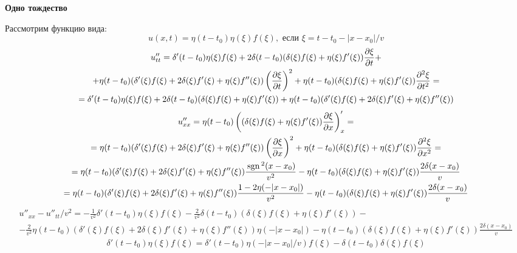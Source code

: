 \textbf{Одно тождество}

Рассмотрим функцию вида:
\[
	u(x, t) = \eta(t - t_0) \eta(\xi) f(\xi), \text{ если } \xi = t - t_0 - |x - x_0|/v 
\]
\[
	\begin{gathered}
	u''_{tt} = 
	\delta'(t - t_0) \eta(\xi) f(\xi) + 
	2 \delta(t - t_0) (\delta(\xi) f(\xi) + \eta(\xi) f'(\xi)) \frac{\partial \xi}{\partial t} + 
	\\ +
	\eta(t - t_0) (\delta'(\xi) f(\xi) + 2 \delta(\xi) f'(\xi) + \eta(\xi) f''(\xi)) \left(\frac{\partial \xi}{\partial t}\right)^2 +
	\eta(t - t_0) (\delta(\xi) f(\xi) + \eta(\xi) f'(\xi)) \frac{\partial^2 \xi}{\partial t^2} =
	\\ =
	\delta'(t - t_0) \eta(\xi) f(\xi) + 
	2 \delta(t - t_0) (\delta(\xi) f(\xi) + \eta(\xi) f'(\xi)) +
	\eta(t - t_0) (\delta'(\xi) f(\xi) + 2 \delta(\xi) f'(\xi) + \eta(\xi) f''(\xi))
	\end{gathered}
\]
\[
	\begin{gathered}
	u''_{xx} = 
	\eta(t - t_0) 
	\left(
	(\delta(\xi) f(\xi) + \eta(\xi) f'(\xi)) \frac{\partial \xi}{\partial x} 
	\right)'_x = 
	\\ =
	\eta(t - t_0)
	(\delta'(\xi) f(\xi) + 2 \delta(\xi) f'(\xi) + \eta(\xi) f''(\xi)) \left(\frac{\partial \xi}{\partial x}\right)^2 
	+
	\eta(t - t_0)
	(\delta(\xi) f(\xi) + \eta(\xi) f'(\xi)) \frac{\partial^2 \xi}{\partial x^2} =
	\\ =
	\eta(t - t_0)
	(\delta'(\xi) f(\xi) + 2 \delta(\xi) f'(\xi) + \eta(\xi) f''(\xi)) \frac{\mathrm{\,sgn}\,^2(x - x_0)}{v^2}
	-
	\eta(t - t_0)
	(\delta(\xi) f(\xi) + \eta(\xi) f'(\xi)) \frac{2 \delta(x - x_0)}{v}
	\\ =
	\eta(t - t_0)
	(\delta'(\xi) f(\xi) + 2 \delta(\xi) f'(\xi) + \eta(\xi) f''(\xi)) \frac{1 - 2 \eta(- | x - x_0 |)}{v^2}
	-
	\eta(t - t_0)
	(\delta(\xi) f(\xi) + \eta(\xi) f'(\xi)) \frac{2 \delta(x - x_0)}{v}
	\end{gathered}
\]
\[
	\begin{gathered}
	u''_{xx} - u''_{tt}/v^2 = 
	- \frac{1}{v^2} \delta'(t - t_0) \eta(\xi) f(\xi) - 
	\frac{2}{v^2} \delta(t - t_0) (\delta(\xi) f(\xi) + \eta(\xi) f'(\xi)) - 
	\\ -
	\frac{2}{v^2} \eta(t - t_0)
	(\delta'(\xi) f(\xi) + 2 \delta(\xi) f'(\xi) + \eta(\xi) f''(\xi))\eta(- | x - x_0 |)  - 
	\eta(t - t_0)
	(\delta(\xi) f(\xi) + \eta(\xi) f'(\xi)) \frac{2 \delta(x - x_0)}{v}
	\end{gathered}
\]
\[
	\begin{gathered}
	\delta'(t - t_0) \eta(\xi) f(\xi) = \delta'(t - t_0) \eta(- | x - x_0 |/v) f(\xi) - \delta(t - t_0) \delta(\xi) f(\xi)
	\end{gathered}
\]


